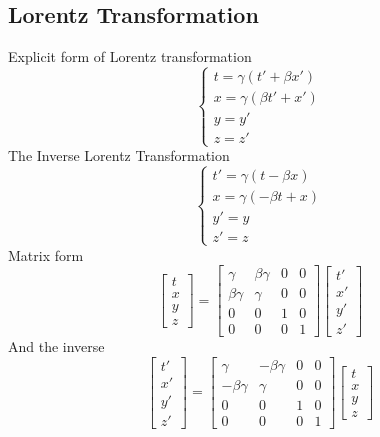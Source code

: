 \documentclass[12pt]{article}
\begin{document}
\subsection{Lorentz Transformation}
Explicit form of Lorentz transformation
\[
\begin{cases}
    t = \gamma(t'+\beta x')\\
    x = \gamma(\beta t' + x')\\
    y=y'\\
    z=z'
\end{cases}
\]
The Inverse Lorentz Transformation
\[
\begin{cases}
    t' = \gamma(t-\beta x)\\
    x = \gamma(-\beta t + x)\\
    y'=y\\
    z'=z
\end{cases}
\]
Matrix form
\[
\begin{bmatrix}
    t \\ x \\ y \\ z
\end{bmatrix}
=
\begin{bmatrix}
    \gamma      &   \beta\gamma   & 0 & 0\\
    \beta\gamma &   \gamma & 0 & 0\\
    0&0&1&0\\
    0&0&0&1
\end{bmatrix}
\begin{bmatrix}
    t'\\ x' \\ y' \\ z'
\end{bmatrix}
\]
And the inverse
\[
\begin{bmatrix}
    t' \\ x' \\ y' \\ z'
\end{bmatrix}
=
\begin{bmatrix}
    \gamma      &   -\beta\gamma   & 0 & 0\\
    -\beta\gamma &   \gamma & 0 & 0\\
    0&0&1&0\\
    0&0&0&1
\end{bmatrix}
\begin{bmatrix}
    t\\ x \\ y \\ z
\end{bmatrix}
\]
\end{document}
